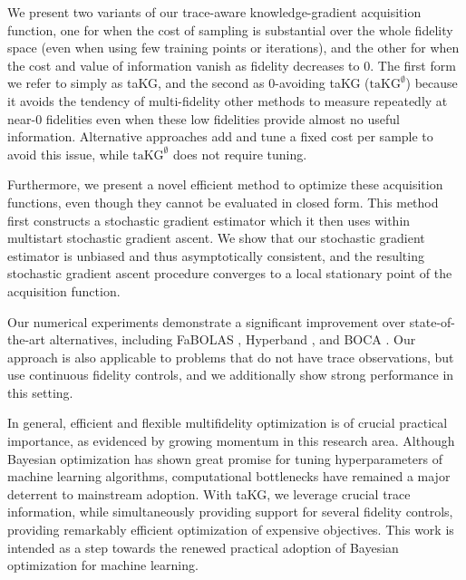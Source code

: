\documentclass[letterpaper]{article}
\newcommand{\taKGE}{\text{taKG}^\emptyset}
\numberwithin{equation}{section}
\begin{document}
We present two variants of our trace-aware knowledge-gradient acquisition function, one for when the cost of sampling is substantial over the whole fidelity space (even when using few training points or iterations), and the other for when the cost and value of information vanish as fidelity decreases to 0.  The first form we refer to simply as taKG, and the second as 0-avoiding taKG ($\taKGE$) because it avoids the tendency of multi-fidelity other methods to measure repeatedly at near-0 fidelities even when these low fidelities provide almost no useful information.  Alternative approaches \citep{mcleod2017practical,klein2016fast} add and tune a fixed cost per sample to avoid this issue, while $\taKGE$ does not require tuning. 

Furthermore, we present a novel efficient method to optimize these acquisition functions, even though they cannot be evaluated in closed form.
 This method first constructs a stochastic gradient estimator which it then uses within multistart stochastic gradient ascent. We show that our stochastic gradient estimator is unbiased and thus asymptotically consistent, and the resulting stochastic gradient ascent procedure converges to a local stationary point of the acquisition function.
 
Our numerical experiments demonstrate a significant improvement over state-of-the-art alternatives, including FaBOLAS \citep{klein2016fast,klein2015towards}, Hyperband \citep{li2016hyperband}, and 
BOCA \citep{kandasamy2017multi}. Our approach is also applicable to problems that do not have trace observations, but use continuous fidelity controls, and we additionally show strong performance in this setting.

In general, efficient and flexible multifidelity optimization is of crucial practical importance, as evidenced by growing momentum in this research area. Although Bayesian optimization has shown great promise for tuning hyperparameters of machine learning algorithms, computational bottlenecks have remained a major deterrent to mainstream adoption. With taKG, we leverage crucial trace information, while simultaneously providing support for several fidelity controls, providing remarkably efficient optimization of expensive objectives. This work is intended as a step towards the renewed practical adoption of Bayesian optimization for machine learning.

\end{document}
